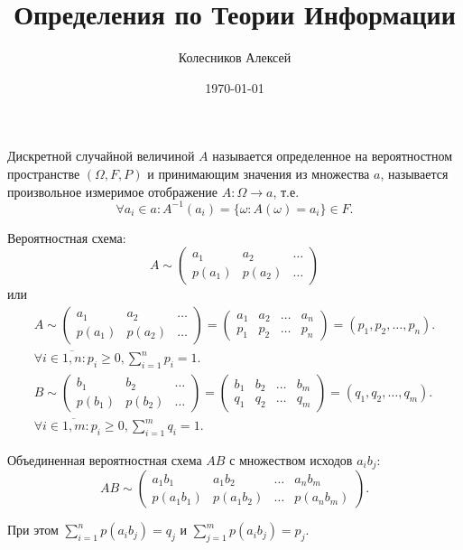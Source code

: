 \documentclass{article}
\title{Определения по Теории Информации}
\date{\today}
\author{Колесников Алексей}
\begin{document}
\maketitle

\opr Дискретной случайной величиной $A$ называется определенное на вероятностном пространстве $(\Omega, F, P)$ и принимающим
значения из множества $a$, называется произвольное измеримое отображение $A: \Omega \rightarrow a$, т.е.
$$
\forall a_i \in a : A^{-1}(a_i) = \{\omega: A(\omega) = a_i\} \in F.
$$

\opr Вероятностная схема:
$$
A \sim
\begin{pmatrix}
    a_1 & a_2 & \dots \\
    p(a_1) & p(a_2) & \dots
\end{pmatrix}
$$
или
\begin{align*}
A \sim
\begin{pmatrix}
    a_1 & a_2 & \dots \\
    p(a_1) & p(a_2) & \dots
\end{pmatrix}
=
\begin{pmatrix}
    a_1 & a_2 & \dots & a_n \\
    p_1 & p_2 & \dots & p_n
\end{pmatrix}
=
( p_1, p_2, \dots, p_n ). \\
\forall i \in \overline{1, n} : p_i \geq 0, \sum_{i=1}^{n} p_i = 1.\\
B \sim
\begin{pmatrix}
    b_1 & b_2 & \dots \\
    p(b_1) & p(b_2) & \dots
\end{pmatrix}
=
\begin{pmatrix}
    b_1 & b_2 & \dots & b_m \\
    q_1 & q_2 & \dots & q_m
\end{pmatrix}
=
( q_1, q_2, \dots, q_m ). \\
\forall i \in \overline{1, m} : p_i \geq 0, \sum_{i=1}^{m} q_i = 1.
\end{align*}

\opr Объединенная вероятностная схема $AB$ с множеством исходов $a_ib_j$:
$$
AB \sim 
\begin{pmatrix}
    a_1b_1 & a_1b_2 & \dots & a_nb_m \\
    p(a_1b_1) & p(a_1b_2) & \dots & p(a_nb_m)
\end{pmatrix}.
$$

При этом $\sum\limits_{i=1}^{n} p(a_ib_j) = q_j$ и $\sum\limits_{j=1}^{m}p(a_ib_j) = p_j$.
\end{document}
